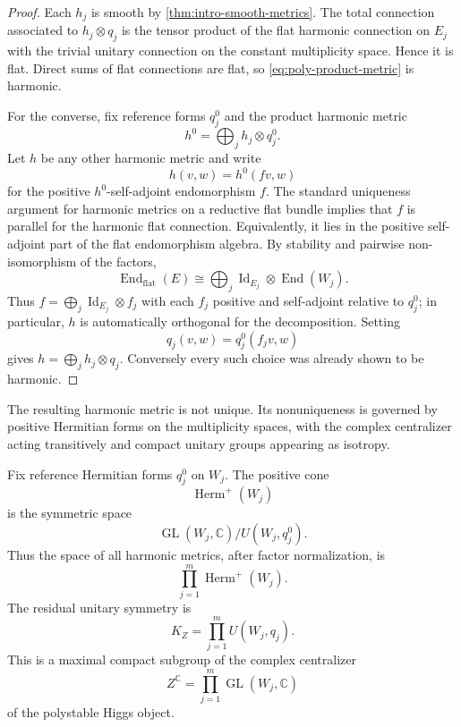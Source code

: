 \documentclass[11pt,reqno]{amsart}
\theoremstyle{definition}
\theoremstyle{remark}
\newcommand{\C}{\mathbb C}
\newcommand{\End}{\operatorname{End}}
\newcommand{\Id}{\operatorname{Id}}
\begin{document}
\begin{proof}
Each $h_j$ is smooth by \cref{thm:intro-smooth-metrics}.  The total connection associated to $h_j\otimes q_j$ is the tensor product of the flat harmonic connection on $E_j$ with the trivial unitary connection on the constant multiplicity space.  Hence it is flat.  Direct sums of flat connections are flat, so \eqref{eq:poly-product-metric} is harmonic.

For the converse, fix reference forms $q_j^0$ and the product harmonic metric
\[
  h^0=\bigoplus_j h_j\otimes q_j^0.
\]
Let $h$ be any other harmonic metric and write
\[
  h(v,w)=h^0(fv,w)
\]
for the positive $h^0$-self-adjoint endomorphism $f$.  The standard uniqueness argument for harmonic metrics on a reductive flat bundle \cite{Corlette1988,Simpson1992} implies that $f$ is parallel for the harmonic flat connection.  Equivalently, it lies in the positive self-adjoint part of the flat endomorphism algebra.  By stability and pairwise non-isomorphism of the factors,
\[
  \End_{\mathrm{flat}}(E)
  \cong\bigoplus_j \Id_{E_j}\otimes\End(W_j).
\]
Thus $f=\bigoplus_j\Id_{E_j}\otimes f_j$ with each $f_j$ positive and self-adjoint relative to $q_j^0$; in particular, $h$ is automatically orthogonal for the decomposition.  Setting
\[
  q_j(v,w)=q_j^0(f_jv,w)
\]
gives $h=\bigoplus_j h_j\otimes q_j$.  Conversely every such choice was already shown to be harmonic.
\end{proof}


The resulting harmonic metric is not unique.  Its nonuniqueness is governed by positive Hermitian forms on the multiplicity spaces, with the complex centralizer acting transitively and compact unitary groups appearing as isotropy.


Fix reference Hermitian forms $q_j^0$ on $W_j$.  The positive cone
\[
  \operatorname{Herm}^+(W_j)
\]
is the symmetric space
\[
  \operatorname{GL}(W_j,\C)/U(W_j,q_j^0).
\]
Thus the space of all harmonic metrics, after factor normalization, is
\begin{equation}\label{eq:poly-metric-fibre}
  \prod_{j=1}^m\operatorname{Herm}^+(W_j).
\end{equation}
The residual unitary symmetry is
\begin{equation}\label{eq:compact-centralizer}
  K_Z=\prod_{j=1}^mU(W_j,q_j).
\end{equation}
This is a maximal compact subgroup of the complex centralizer
\[
  Z^\C=\prod_{j=1}^m\operatorname{GL}(W_j,\C)
\]
of the polystable Higgs object.
\end{document}
